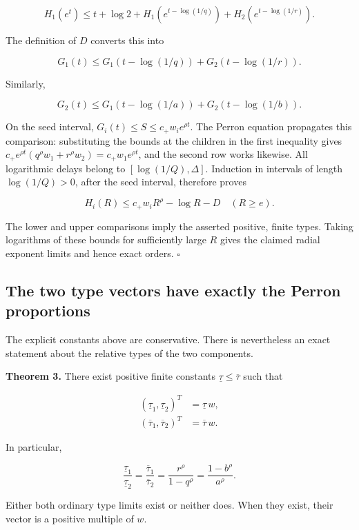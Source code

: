 \[
H_1(e^t)\le t+\log2
 +H_1(e^{t-\log(1/q)})+H_2(e^{t-\log(1/r)}).
\]

The definition of \(D\) converts this into

\[
G_1(t)\le G_1(t-\log(1/q))+G_2(t-\log(1/r)).
\]

Similarly,

\[
G_2(t)\le G_1(t-\log(1/a))+G_2(t-\log(1/b)).
\]

On the seed interval, \(G_i(t)\le S\le c_+w_i e^{\rho t}\). The Perron
equation propagates this comparison: substituting the bounds at the
children in the first inequality gives
\(c_+e^{\rho t}(q^\rho w_1+r^\rho w_2)=c_+w_1e^{\rho t}\), and the
second row works likewise. All logarithmic delays belong to
\([\log(1/Q),\Delta]\). Induction in intervals of length
\(\log(1/Q)>0\), after the seed interval, therefore proves

\[
\boxed{H_i(R)\le c_+w_iR^\rho-\log R-D\quad(R\ge e).}
\]

The lower and upper comparisons imply the asserted positive, finite
types. Taking logarithms of these bounds for sufficiently large \(R\)
gives the claimed radial exponent limits and hence exact orders.
\(\square\)

\hypertarget{v11-coupled_growth_full-the-two-type-vectors-have-exactly-the-perron-proportions}{%
\subsection{The two type vectors have exactly the Perron
proportions}\label{v11-coupled_growth_full-the-two-type-vectors-have-exactly-the-perron-proportions}}

The explicit constants above are conservative. There is nevertheless an
exact statement about the relative types of the two components.

\textbf{Theorem 3.} There exist positive finite constants
\(\underline\tau\le\overline\tau\) such that

\[
\boxed{\begin{aligned}
(\underline\tau_1,\underline\tau_2)^T&=\underline\tau\,w,\\
(\overline\tau_1,\overline\tau_2)^T&=\overline\tau\,w.
\end{aligned}}
\]

In particular,

\[
\frac{\underline\tau_1}{\underline\tau_2}
=\frac{\overline\tau_1}{\overline\tau_2}
=\frac{r^\rho}{1-q^\rho}
=\frac{1-b^\rho}{a^\rho}.
\]

Either both ordinary type limits exist or neither does. When they exist,
their vector is a positive multiple of \(w\).

